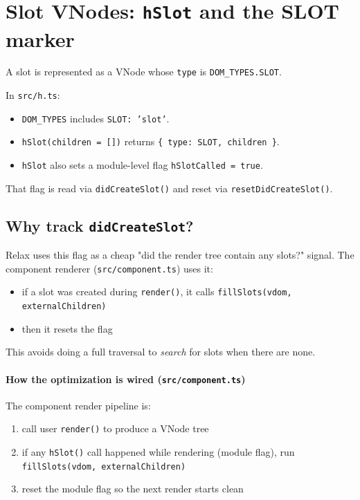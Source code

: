 \section{Slot VNodes: \texttt{hSlot} and the SLOT marker}

A slot is represented as a VNode whose \texttt{type} is \texttt{DOM\_TYPES.SLOT}.

In \texttt{src/h.ts}:

\begin{itemize}
  \item \texttt{DOM\_TYPES} includes \texttt{SLOT: 'slot'}.
  \item \texttt{hSlot(children = [])} returns \texttt{\{ type: SLOT, children \}}.
  \item \texttt{hSlot} also sets a module-level flag \texttt{hSlotCalled = true}.
\end{itemize}

That flag is read via \texttt{didCreateSlot()} and reset via \texttt{resetDidCreateSlot()}.

\subsection{Why track \texttt{didCreateSlot}?}

Relax uses this flag as a cheap "did the render tree contain any slots?" signal.
The component renderer (\texttt{src/component.ts}) uses it:

\begin{itemize}
  \item if a slot was created during \texttt{render()}, it calls \texttt{fillSlots(vdom, externalChildren)}
  \item then it resets the flag
\end{itemize}

This avoids doing a full traversal to \emph{search} for slots when there are none.

\paragraph{How the optimization is wired (\texttt{src/component.ts})}

The component render pipeline is:

\begin{enumerate}
  \item call user \texttt{render()} to produce a VNode tree
  \item if any \texttt{hSlot()} call happened while rendering (module flag), run \texttt{fillSlots(vdom, externalChildren)}
  \item reset the module flag so the next render starts clean
\end{enumerate}

